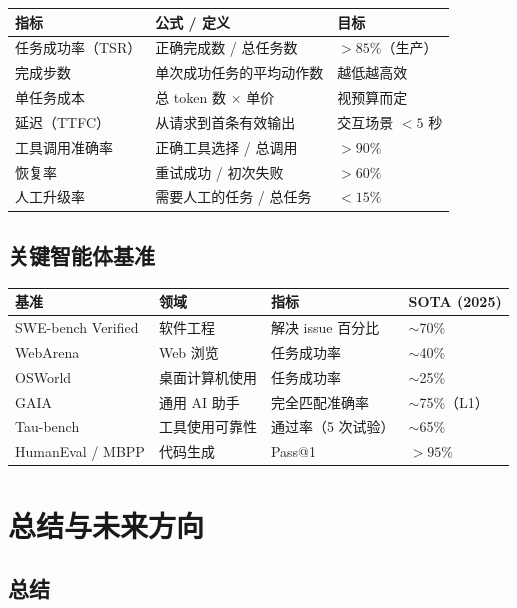 \noindent\begin{tabularx}{\linewidth}{@{}l Z{1.47} Z{0.53}@{}}
\toprule
\textbf{指标} & \textbf{公式 / 定义} & \textbf{目标} \\
\midrule
任务成功率（TSR） & 正确完成数 / 总任务数 & $>85\%$（生产） \\
完成步数 & 单次成功任务的平均动作数 & 越低越高效 \\
单任务成本 & 总 token 数 $\times$ 单价 & 视预算而定 \\
延迟（TTFC） & 从请求到首条有效输出 & 交互场景 $<5$ 秒 \\
工具调用准确率 & 正确工具选择 / 总调用 & $>90\%$ \\
恢复率 & 重试成功 / 初次失败 & $>60\%$ \\
人工升级率 & 需要人工的任务 / 总任务 & $<15\%$ \\
\bottomrule
\end{tabularx}

\section{关键智能体基准}
\label{key-agentic-benchmarks}

\noindent\begin{tabularx}{\linewidth}{@{}l Z{0.88} Z{1.45} Z{0.67}@{}}
\toprule
\textbf{基准} & \textbf{领域} & \textbf{指标} & \textbf{SOTA (2025)} \\
\midrule
SWE-bench Verified & 软件工程 & 解决 issue 百分比 & $\sim$70\% \\
WebArena & Web 浏览 & 任务成功率 & $\sim$40\% \\
OSWorld & 桌面计算机使用 & 任务成功率 & $\sim$25\% \\
GAIA & 通用 AI 助手 & 完全匹配准确率 & $\sim$75\%（L1） \\
Tau-bench & 工具使用可靠性 & 通过率（5 次试验） & $\sim$65\% \\
HumanEval / MBPP & 代码生成 & Pass@1 & $>95\%$ \\
\bottomrule
\end{tabularx}

\chapter{总结与未来方向}
\label{ch:conclusion}

\section{总结}
\label{summary-dup2}

